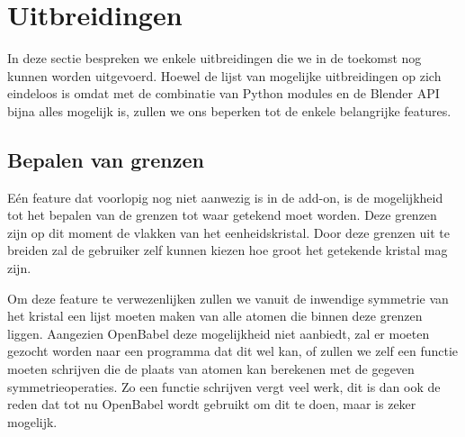 \section{Uitbreidingen}
In deze sectie bespreken we enkele uitbreidingen die we in de toekomst nog kunnen worden uitgevoerd. Hoewel de lijst van mogelijke uitbreidingen op zich eindeloos is omdat met de combinatie van Python modules en de Blender API bijna alles mogelijk is, zullen we ons beperken tot de enkele belangrijke features.

\subsection{Bepalen van grenzen}
Eén feature dat voorlopig nog niet aanwezig is in de add-on, is de mogelijkheid tot het bepalen van de grenzen tot waar getekend moet worden. Deze grenzen zijn op dit moment de vlakken van het eenheidskristal. Door deze grenzen uit te breiden zal de gebruiker zelf kunnen kiezen hoe groot het getekende kristal mag zijn. 
\par
Om deze feature te verwezenlijken zullen we vanuit de inwendige symmetrie van het kristal een lijst moeten maken van alle atomen die binnen deze grenzen liggen. Aangezien OpenBabel deze mogelijkheid niet aanbiedt, zal er moeten gezocht worden naar een programma dat dit wel kan, of zullen we zelf een functie moeten schrijven die de plaats van atomen kan berekenen met de gegeven symmetrieoperaties. Zo een functie schrijven vergt veel werk, dit is dan ook de reden dat tot nu OpenBabel wordt gebruikt om dit te doen, maar is zeker mogelijk.
\par

